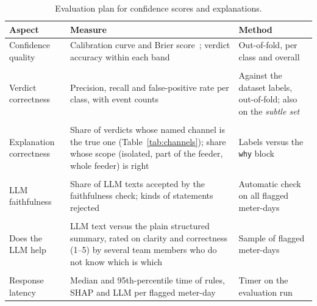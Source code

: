 \documentclass[11pt,a4paper]{article}
\begin{document}
\begin{table}[H]
\centering
\small
\begin{tabularx}{\textwidth}{@{}>{\raggedright\arraybackslash}p{3.1cm}LL@{}}
\toprule
\textbf{Aspect} & \textbf{Measure} & \textbf{Method} \\
\midrule
Confidence quality & Calibration curve and Brier score~\cite{trustcalpage}; verdict accuracy within each band & Out-of-fold, per class and overall \\ \\
Verdict correctness & Precision, recall and false-positive rate per class, with event counts & Against the dataset labels, out-of-fold; also on the \emph{subtle set} \\ \\
Explanation correctness & Share of verdicts whose named channel is the true one (Table~\ref{tab:channels}); share whose scope (isolated, part of the feeder, whole feeder) is right & Labels versus the \texttt{why} block \\ \\
LLM faithfulness & Share of LLM texts accepted by the faithfulness check; kinds of statements rejected & Automatic check on all flagged meter-days \\ \\
Does the LLM help & LLM text versus the plain structured summary, rated on clarity and correctness (1--5) by several team members who do not know which is which & Sample of flagged meter-days \\ \\
Response latency & Median and 95th-percentile time of rules, SHAP and LLM per flagged meter-day & Timer on the evaluation run \\
\bottomrule
\end{tabularx}
\caption{Evaluation plan for confidence scores and explanations.}
\label{tab:evalplan}
\end{table}
\end{document}

